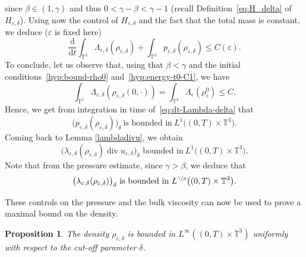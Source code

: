 \documentclass[10pt]{amsart}
\newcommand{\<}{\bigl\langle}
\renewcommand{\>}{\bigr\rangle}
\newcommand{\labeleq}[1]{}
\newtheorem{prop}[thm]{Proposition}
\theoremstyle{definition}
\theoremstyle{remark}
\newcommand{\TT}{\mathbb{T}^3}
\DeclareMathOperator{\Div}{div}
\newcommand{\Dt}{\dfrac{\mathrm{d}}{\mathrm{d} t}}
\let\ep\varepsilon
\begin{document}
since $\beta \in (1,\gamma)$ and thus $0 < \gamma - \beta < \gamma - 1$ (recall Definition~\eqref{eq:H_delta} of $H_{\ep,\delta}$).
Using now the control of $H_{\ep,\delta}$ and the fact that the total mass is constant, we deduce ($\ep$ is fixed here)
\[
\Dt \int_{\TT}{\Lambda_{\ep,\delta}(\rho_{\ep,\delta})} + \int_{\TT}{p_{\ep,\delta}(\rho_{\ep,\delta})}
\leq C(\ep).
\]
To conclude, let us observe that, using that $\beta <\gamma$ and the initial conditions~\eqref{hyp:bound-rho0} and~\eqref{hyp:energy-t0-C1}, we have
\begin{equation*}
\int_{\TT}{\Lambda_{\ep,\delta}(\rho_{\ep,\delta}(0,\cdot)) }
= \int_{\TT}{\Lambda_{\ep}(\rho_\ep^0) }
\leq C.
\end{equation*}
Hence, we get from integration in time of~\eqref{eq:dt-Lambda-delta} that
\begin{equation*}\labeleq{bound-p-delta}
\big(p_{\ep,\delta}(\rho_{\ep,\delta})\big)_\delta~ \text{is bounded in} ~L^1\big((0,T)\times \TT \big).
\end{equation*}
Coming back to Lemma \ref{lambdadivu}, we obtain
\begin{equation*}\label{bound-lambdadivu-delta}
\big(\lambda_{\ep,\delta}(\rho_{\ep,\delta}) \Div u_{\ep,\delta}\big)_\delta \text{ bounded in}~ L^1\big((0,T)\times \TT\big).
\end{equation*}
Note that from the pressure estimate, since $\gamma > \beta$, we deduce that
\begin{equation*}\label{bound-lambda-delta}
\big(\lambda_{\ep,\delta}(\rho_{\ep,\delta})\big)_\delta ~ \text{is bounded in} ~L^{\sfrac{\gamma}{\beta}}\big((0,T)\times \TT \big).
\end{equation*}

These controls on the pressure and the bulk viscosity can now be used to prove a maximal bound on the density.
\begin{prop}\label{prop:bound_rhodelta}
The density $\rho_{\ep,\delta}$ is bounded in $L^\infty((0,T)\times \TT)$ uniformly with respect to the cut-off parameter $\delta$.
\end{prop}
\end{document}
